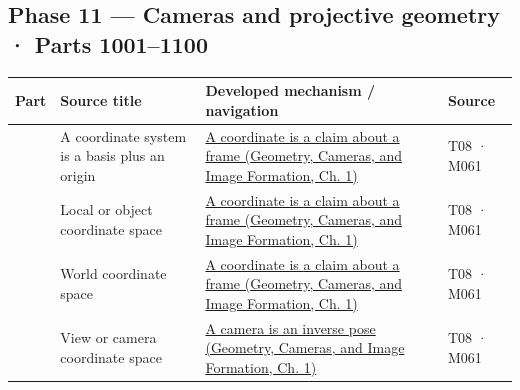 \subsection{Phase 11 --- Cameras and projective geometry · Parts 1001--1100}\label{appendix-fd090d982a15-phase-11-cameras-and-projective-geometry-parts-10011100}

{\def\LTcaptype{none} %
\begin{longtable}[]{@{}
  >{\raggedleft\arraybackslash}p{}
  >{\raggedright\arraybackslash}p{}
  >{\raggedright\arraybackslash}p{}
  >{\raggedright\arraybackslash}p{}@{}}
\toprule\noalign{}
\begin{minipage}[b]{\linewidth}\raggedleft
Part
\end{minipage} & \begin{minipage}[b]{\linewidth}\raggedright
Source title
\end{minipage} & \begin{minipage}[b]{\linewidth}\raggedright
Developed mechanism / navigation
\end{minipage} & \begin{minipage}[b]{\linewidth}\raggedright
Source
\end{minipage} \\
\midrule\noalign{}
\endhead
\bottomrule\noalign{}
\endlastfoot
1001 & A coordinate system is a basis plus an origin & \href{../03-Geometry-Cameras-and-Image-Formation/main.pdf\#nameddest=02-foundations-ii-ch032-a-coordinate-is-a-claim-about-a-frame}{A coordinate is a claim about a frame (Geometry, Cameras, and Image Formation, Ch. 1)} & T08 · M061 \\
1002 & Local or object coordinate space & \href{../03-Geometry-Cameras-and-Image-Formation/main.pdf\#nameddest=02-foundations-ii-ch032-a-coordinate-is-a-claim-about-a-frame}{A coordinate is a claim about a frame (Geometry, Cameras, and Image Formation, Ch. 1)} & T08 · M061 \\
1003 & World coordinate space & \href{../03-Geometry-Cameras-and-Image-Formation/main.pdf\#nameddest=02-foundations-ii-ch032-a-coordinate-is-a-claim-about-a-frame}{A coordinate is a claim about a frame (Geometry, Cameras, and Image Formation, Ch. 1)} & T08 · M061 \\
1004 & View or camera coordinate space & \href{../03-Geometry-Cameras-and-Image-Formation/main.pdf\#nameddest=02-foundations-ii-ch032-a-camera-is-an-inverse-pose}{A camera is an inverse pose (Geometry, Cameras, and Image Formation, Ch. 1)} & T08 · M061 \\

\end{longtable}}
